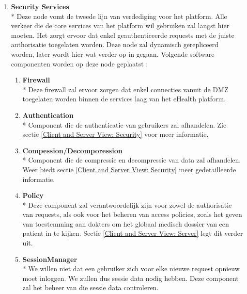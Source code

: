 \documentclass[a4paper,10pt]{article}
\begin{document}
\begin{enumerate}
\item \textbf{Security Services}\\*
Deze node vomt de tweede lijn van verdediging voor het platform. Alle verkeer die de core services van het platform wil gebruiken zal langst hier moeten. Het zorgt ervoor dat enkel geauthenticeerde requests met de juiste authorisatie toegelaten worden. Deze node zal dynamisch gerepliceerd worden, later wordt hier wat verder op in gegaan. Volgende software componenten worden op deze node geplaatst : 
\begin{enumerate}
 \item \textbf{Firewall}\\*
Deze firewall zal ervoor zorgen dat enkel connecties vanuit de DMZ toegelaten worden binnen de services laag van het eHealth platform.
\item \textbf{Authentication}\\*
Component die de authenticatie van gebruikers zal afhandelen. Zie sectie \ref{Client and Server View: Security} voor meer informatie.
\item \textbf{Compession/Decomporession}\\*
Component die de compressie en decompressie van data zal afhandelen. Weer biedt sectie \ref{Client and Server View: Security} meer gedetailleerde informatie.
\item \textbf{Policy}\\*
Deze component zal verantwoordelijk zijn voor zowel de authorisatie van requests, als ook voor het beheren van access policies, zoals het geven van toestemming aan dokters om het globaal medisch dossier van een patient in te kijken. Sectie \ref{Client and Server View: Server} legt dit verder uit.
\item \textbf{SessionManager}\\*
We willen niet dat een gebruiker zich voor elke nieuwe request opnieuw moet inloggen. We zullen dus sessie data nodig hebben. Deze component zal het beheer van die sessie data controleren.
\end{enumerate}


\end{enumerate}
\end{document}
